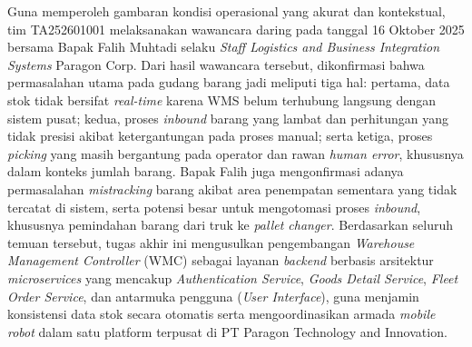 Guna memperoleh gambaran kondisi operasional yang akurat dan kontekstual, tim TA252601001 melaksanakan wawancara daring pada tanggal 16 Oktober 2025 bersama Bapak Falih Muhtadi selaku \textit{Staff Logistics and Business Integration Systems} Paragon Corp. Dari hasil wawancara tersebut, dikonfirmasi bahwa permasalahan utama pada gudang barang jadi meliputi tiga hal: pertama, data stok tidak bersifat \textit{real-time} karena WMS belum terhubung langsung dengan sistem pusat; kedua, proses \textit{inbound} barang yang lambat dan perhitungan yang tidak presisi akibat ketergantungan pada proses manual; serta ketiga, proses \textit{picking} yang masih bergantung pada operator dan rawan \textit{human error}, khususnya dalam konteks jumlah barang. Bapak Falih juga mengonfirmasi adanya permasalahan \textit{mistracking} barang akibat area penempatan sementara yang tidak tercatat di sistem, serta potensi besar untuk mengotomasi proses \textit{inbound}, khususnya pemindahan barang dari truk ke \textit{pallet changer}. Berdasarkan seluruh temuan tersebut, tugas akhir ini mengusulkan pengembangan \textit{Warehouse Management Controller} (WMC) sebagai layanan \textit{backend} berbasis arsitektur \textit{microservices} yang mencakup \textit{Authentication Service}, \textit{Goods Detail Service}, \textit{Fleet Order Service}, dan antarmuka pengguna (\textit{User Interface}), guna menjamin konsistensi data stok secara otomatis serta mengoordinasikan armada \textit{mobile robot} dalam satu platform terpusat di PT Paragon Technology and Innovation.
